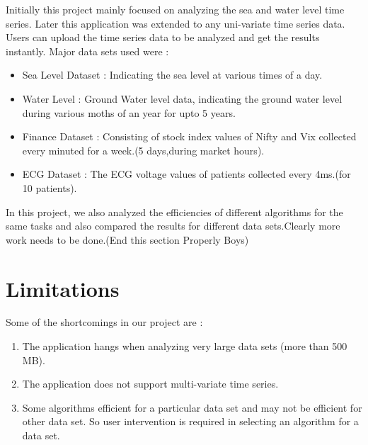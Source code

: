 \documentclass[12pt]{report}
\begin{document}
Initially this project mainly focused on analyzing the sea and water level time series. Later this application was extended to any uni-variate time series data. Users can upload the time series data to be analyzed and get the results instantly. Major data sets used were :
\begin{itemize}
\item Sea Level Dataset : Indicating the sea level at various times of a day.
\item Water Level : Ground Water level data, indicating the ground water level during various moths of an year for upto 5 years.
\item Finance Dataset : Consisting of stock index values of  Nifty and Vix collected every minuted for a week.(5 days,during market hours).
\item ECG Dataset : The ECG  voltage values of patients collected every 4ms.(for 10 patients).
\end{itemize}


In this project, we also analyzed the efficiencies of different algorithms for the same tasks and also compared the results for different data sets.Clearly more work needs to be done.(End this section Properly Boys)


\section{Limitations}
Some of the shortcomings in our project are :
\begin{enumerate}

\item{} The application hangs when analyzing very large data sets (more than 500 MB).
\item{} The application does not support multi-variate time series.
\item{}Some algorithms efficient for a particular data set and may not be efficient for other data set. So user intervention is required in selecting an algorithm for a data set.
\end{enumerate}
\end{document}
